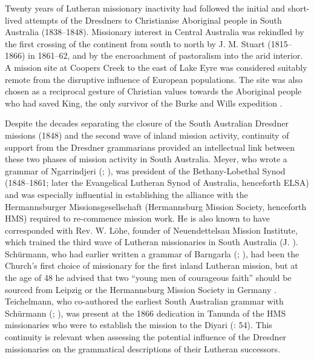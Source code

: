 Twenty years of Lutheran missionary inactivity had followed the initial and short-lived attempts of the Dresdners to Christianise Aboriginal people in South Australia (1838--1848). Missionary interest in Central Australia was rekindled by the first crossing of the continent from south to north by J. M. Stuart (1815--1866) in 1861--62, and by the encroachment of pastoralism into the arid interior. A mission site at Coopers Creek to the east of Lake Eyre was considered suitably remote from the disruptive influence of European populations. The site was also chosen as a reciprocal gesture of Christian values towards the Aboriginal people who had saved King, the only survivor of the Burke and Wills expedition \citep[137]{clark_aboriginal_2013}.

Despite the decades separating the closure of the South Australian Dresdner missions (1848) and the second wave of inland mission activity, continuity of support from the Dresdner grammarians provided an intellectual link between these two phases of mission activity in South Australia. Meyer, who wrote a grammar of Ngarrindjeri (\citeyear{meyer_vocabulary_1843}; ), was president of the Bethany-Lobethal Synod (1848--1861; later the Evangelical Lutheran Synod of Australia, henceforth ELSA) and was especially influential in establishing the alliance with the Hermannsburger Missionsgesellschaft (Hermannsburg Mission Society, henceforth HMS) required to re-commence mission work. He is also known to have corresponded with Rev. W. Löhe, founder of Neuendettelsau Mission Institute, which trained the third wave of Lutheran missionaries in South Australia (J. \citealt[249]{strehlow_tale_2011}). Schürmann, who had earlier written a grammar of Barngarla (\citeyear{schurmann_vocabulary_1844}; ), had been the Church’s first choice of missionary for the first inland Lutheran mission, but at the age of 48 he advised that two “young men of courageous faith” should be sourced from Leipzig or the Hermannsburg Mission Society in Germany \citep[60]{zweck_for_2012}. Teichelmann, who co-authored the earliest South Australian grammar with Schürmann (\citeyear{teichelmann_outlines_1840}; ), was present at the 1866 dedication in Tanunda of the HMS missionaries who were to establish the mission to the Diyari (\citealt{proeve_work_1952}: 54). This continuity is relevant when assessing the potential influence of the Dresdner missionaries on the grammatical descriptions of their Lutheran successors.

